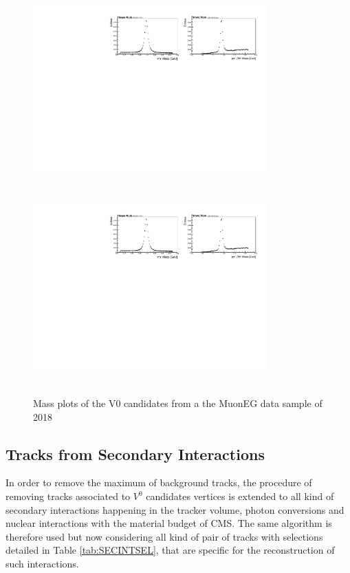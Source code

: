 \documentclass{cernatlasnote}
\begin{document}
        
\begin{figure}[ht]
\hspace{-1.4cm}
\includegraphics[height=7.5cm, width=9cm, trim= 0cm 6.5cm 10cm 0.cm,clip]{images/V0Candidates/V0Mass.pdf}\includegraphics[height=7.5cm, width=9cm, trim= 10cm 6.5cm 0cm 0.cm,clip]{images/V0Candidates/V0Mass.pdf}
\caption{\label{fig:V0Candidates} Mass plots of the V0 candidates from a the MuonEG data sample of 2018}
\end{figure}


        
    \subsection{Tracks from Secondary Interactions}

        In order to remove the maximum of background tracks, the procedure of removing tracks associated to $V^0$ candidates vertices is extended to all kind of secondary interactions happening in the tracker volume, photon conversions and nuclear interactions with the material budget of CMS. The same algorithm is therefore used but now considering all kind of pair of tracks with selections detailed in Table \ref{tab:SECINTSEL}, that are specific for the reconstruction of such interactions.\\
\end{document}
